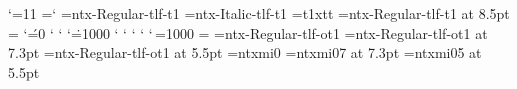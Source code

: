 %
%
%
\def\makeatletter{\catcode`\@=11 }%
\def\makeatother{\catcode`\@=12 }%
\makeatletter%
%
\newcount\tempcnt@i {} %
=`\-%
\font\tenntxregt=ntx-Regular-tlf-t1\relax%
\font\tenntxit=ntx-Italic-tlf-t1\relax%
\font\tentxtt=t1xtt\relax \hyphenchar{} %
\font\ninentxregt=ntx-Regular-tlf-t1 at 8.5pt\relax%
\boxmaxdepth=\maxdimen%
\sfcode`\'=0 \sfcode` \sfcode` \sfcode`\.=1000 \sfcode` %
\sfcode` \sfcode` \sfcode` \sfcode`\,=1000 %
\spaceskip=0pt\relax%
\xspaceskip=0pt\relax%
\def\normal{%
  \font\tenntxregt%
  \baselineskip=12pt\relax%
  \abovedisplayskip=10pt\relax%
  \belowdisplayskip=\abovedisplayskip\relax%
  \abovedisplayshortskip=0pt\relax%
  \belowdisplayshortskip=6pt\relax%
}%
\def\small{%
  \font\ninentxregt%
  \baselineskip=10pt\relax%
  \abovedisplayskip=8.5pt\relax%
  \belowdisplayskip=\abovedisplayskip\relax%
  \abovedisplayshortskip=0pt\relax%
  \belowdisplayshortskip=4pt\relax%
}%
\normal%
\tabskip=0pt\relax%
\font\tenntxregm=ntx-Regular-tlf-ot1\relax%
\font\sevenntxregm=ntx-Regular-tlf-ot1 at 7.3pt\relax%
\font\fiventxregm=ntx-Regular-tlf-ot1 at 5.5pt\relax%
\font\tenntxmi=ntxmi0\relax%
\skewchar{} %
\font\sevenntxmi=ntxmi07 at 7.3pt\relax%
\skewchar{} %
\font\fiventxmi=ntxmi05 at 5.5pt\relax%
\skewchar{} %
